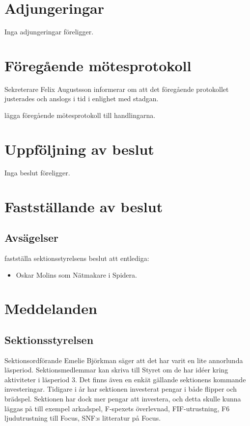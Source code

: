 \documentclass[hidelinks]{sektionsmote} %
\begin{document}
\section{Adjungeringar}
Inga adjungeringar föreligger.


\section{Föregående mötesprotokoll}
Sekreterare Felix Augustsson informerar om att det föregående protokollet justerades och anslogs i tid i enlighet med stadgan.
\begin{beslut}
    \item lägga föregående mötesprotokoll till handlingarna. 
\end{beslut}


\section{Uppföljning av beslut}
Inga beslut föreligger.


\section{Fastställande av beslut}
\subsection{Avsägelser}
\begin{beslut}
  \item fastställa sektionsstyrelsens beslut att entlediga:
  \begin{itemize}
      \item Oskar Molins som Nätmakare i Spidera.
  \end{itemize}
\end{beslut}


\section{Meddelanden}
\subsection{Sektionsstyrelsen}
Sektionsordförande Emelie Björkman säger att det har varit en lite annorlunda läsperiod.
Sektionsmedlemmar kan skriva till Styret om de har idéer kring aktiviteter i läsperiod 3.
Det finns även en enkät gällande sektionens kommande investeringar.
Tidigare i år har sektionen investerat pengar i både flipper och brädspel.
Sektionen har dock mer pengar att investera, och detta skulle kunna läggas på till exempel arkadspel, F-spexets överlevnad, FIF-utrustning, F6 ljudutrustning till Focus, SNF:s litteratur på Focus.
\end{document}
